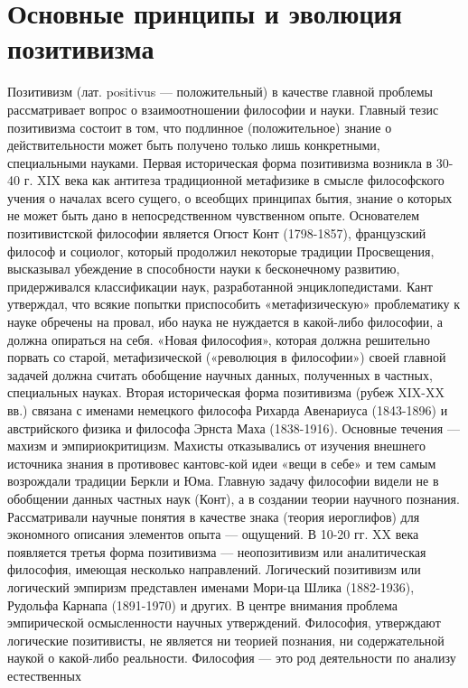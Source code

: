 \documentclass[12pt]{article}
\begin{document}
\newpage
\section{Основные принципы и эволюция позитивизма}
Позитивизм  (лат.  positivus  —  положительный)  в  качестве  главной  проблемы  рассматривает  вопрос  о
взаимоотношении  философии  и  науки.  Главный  тезис  позитивизма  состоит  в  том,  что  подлинное
(положительное) знание о действительности может быть получено только лишь конкретными, специальными
науками.
Первая историческая форма позитивизма возникла в 30-40 г. XIX века как антитеза традиционной метафизике в
смысле философского учения о началах всего сущего, о всеобщих принципах бытия, знание о которых не может
быть дано в непосредственном чувственном опыте. Основателем позитивистской философии является Огюст
Конт (1798-1857), французский философ и социолог, который продолжил некоторые традиции Просвещения,
высказывал убеждение в способности науки к бесконечному развитию, придерживался классификации наук,
разработанной энциклопедистами.
Кант утверждал, что всякие попытки приспособить «метафизическую» проблематику к науке обречены на
провал, ибо наука не нуждается в какой-либо философии, а должна опираться на себя. «Новая философия»,
которая должна решительно порвать со старой, метафизической («революция в философии») своей главной
задачей должна считать обобщение научных данных, полученных в частных, специальных науках.
Вторая историческая форма позитивизма (рубеж XIX-XX вв.) связана с именами немецкого философа Рихарда
Авенариуса (1843-1896) и австрийского физика и философа Эрнста Маха (1838-1916). Основные течения —
махизм и эмпириокритицизм. Махисты отказывались от изучения внешнего источника знания в противовес
кантовс-кой идеи «вещи в себе» и тем самым возрождали традиции Беркли и Юма. Главную задачу философии
видели не в обобщении данных частных наук (Конт), а в создании теории научного познания. Рассматривали
научные  понятия  в  качестве  знака  (теория  иероглифов)  для  экономного  описания  элементов  опыта  —
ощущений.
В 10-20 гг. XX века появляется третья форма позитивизма — неопозитивизм или аналитическая философия,
имеющая несколько направлений.
Логический позитивизм или логический эмпиризм представлен именами Мори-ца Шлика (1882-1936), Рудольфа
Карнапа  (1891-1970)  и  других.  В  центре  внимания  проблема  эмпирической  осмысленности  научных
утверждений.  Философия,  утверждают  логические  позитивисты,  не  является  ни  теорией  познания,  ни
содержательной наукой о какой-либо реальности. Философия — это род деятельности по анализу естественных
\end{document}
